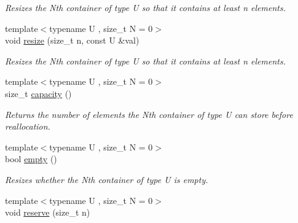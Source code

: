 \begin{DoxyCompactItemize}
\begin{DoxyCompactList}\small\item\em Resizes the Nth container of type U so that it contains at least n elements. \end{DoxyCompactList}\item 
\hypertarget{classheterogeneous_1_1heterovector_3_01_t_00_01_types_8_8_8_4_a4c63ea07b567c36657aa00bf4afc9364}{}{\footnotesize template$<$typename U , size\+\_\+t N = 0$>$ }\\void \hyperlink{classheterogeneous_1_1heterovector_3_01_t_00_01_types_8_8_8_4_a4c63ea07b567c36657aa00bf4afc9364}{resize} (size\+\_\+t n, const U \&val)\label{classheterogeneous_1_1heterovector_3_01_t_00_01_types_8_8_8_4_a4c63ea07b567c36657aa00bf4afc9364}

\begin{DoxyCompactList}\small\item\em Resizes the Nth container of type U so that it contains at least n elements. \end{DoxyCompactList}\item 
\hypertarget{classheterogeneous_1_1heterovector_3_01_t_00_01_types_8_8_8_4_a8505ed548c3336ea36ab64400b509440}{}{\footnotesize template$<$typename U , size\+\_\+t N = 0$>$ }\\size\+\_\+t \hyperlink{classheterogeneous_1_1heterovector_3_01_t_00_01_types_8_8_8_4_a8505ed548c3336ea36ab64400b509440}{capacity} ()\label{classheterogeneous_1_1heterovector_3_01_t_00_01_types_8_8_8_4_a8505ed548c3336ea36ab64400b509440}

\begin{DoxyCompactList}\small\item\em Returns the number of elements the Nth container of type U can store before reallocation. \end{DoxyCompactList}\item 
\hypertarget{classheterogeneous_1_1heterovector_3_01_t_00_01_types_8_8_8_4_a3941c5fd1fbd3b2926ff94d80096d796}{}{\footnotesize template$<$typename U , size\+\_\+t N = 0$>$ }\\bool \hyperlink{classheterogeneous_1_1heterovector_3_01_t_00_01_types_8_8_8_4_a3941c5fd1fbd3b2926ff94d80096d796}{empty} ()\label{classheterogeneous_1_1heterovector_3_01_t_00_01_types_8_8_8_4_a3941c5fd1fbd3b2926ff94d80096d796}

\begin{DoxyCompactList}\small\item\em Resizes whether the Nth container of type U is empty. \end{DoxyCompactList}\item 
\hypertarget{classheterogeneous_1_1heterovector_3_01_t_00_01_types_8_8_8_4_af5f27078881c6b0ba42e7853b2c445d2}{}{\footnotesize template$<$typename U , size\+\_\+t N = 0$>$ }\\void \hyperlink{classheterogeneous_1_1heterovector_3_01_t_00_01_types_8_8_8_4_af5f27078881c6b0ba42e7853b2c445d2}{reserve} (size\+\_\+t n)\label{classheterogeneous_1_1heterovector_3_01_t_00_01_types_8_8_8_4_af5f27078881c6b0ba42e7853b2c445d2}


\end{DoxyCompactItemize}
